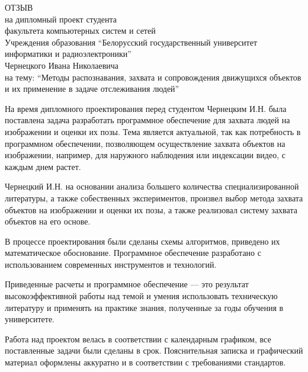 \thispagestyle{empty}

\begin{singlespace}
  {\small
    \begin{center}
      \begin{minipage}{0.8\textwidth}
        \begin{center}
          {\normalsize ОТЗЫВ}\\[0.2cm]
          на дипломный проект студента\\
          факультета компьютерных систем и сетей\\
          Учреждения образования ``Белорусский государственный университет информатики и радиоэлектроники''\\
          Чернецкого Ивана Николаевича\\
          на тему: ``Методы распознавания, захвата и сопровождения движущихся объектов и их применение в задаче отслеживания людей''
        \end{center}
      \end{minipage}
    \end{center}

    На время дипломного проектирования перед студентом Чернецким И.Н. была поставлена задача разработать программное обеспечение для захвата людей на изображении и оценки их позы. Тема является актуальной, так как потребность в программном обеспечении, позволяющем осуществление захвата объектов на изображении, например, для наружного наблюдения или индексации видео, с каждым днем растет.

    Чернецкий И.Н. на основании анализа большего количества специализированной литературы, а также собественных экспериментов, произвел выбор метода захвата объектов на изображении и оценки их позы, а также реализовал систему захвата объектов на его основе.

    В процессе проектирования были сделаны схемы алгоритмов, приведено их математическое обоснование. Программное обеспечение разработано с использованием современных инструментов и технологий.

    Приведенные расчеты и программное обеспечение --- это результат высокоэффективной работы над темой и умения использовать техническую литературу и применять на практике знания, полученные за годы обучения в университете.

    Работа над проектом велась в соответствии с календарным графиком, все поставленные задачи были сделаны в срок. Пояснительная записка и графический материал оформлены аккуратно и в соответствии с требованиями стандартов.

}
\end{singlespace}
